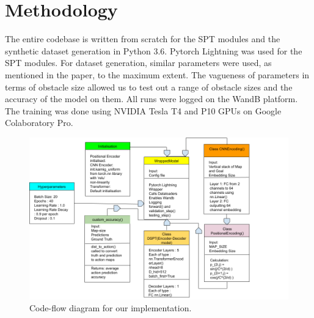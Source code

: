 
\section{Methodology}
The entire codebase is written from scratch for the SPT modules and the synthetic dataset generation in Python 3.6. Pytorch Lightning was used for the SPT modules. For dataset generation, similar parameters were used, as mentioned in the paper, to the maximum extent. The vagueness of parameters in terms of obstacle size allowed us to test out a range of obstacle sizes and the accuracy of the model on them. All runs were logged on the WandB platform. The training was done using NVIDIA Tesla T4 and P10 GPUs on Google Colaboratory Pro.
\begin{figure}
\begin {center}
\includegraphics[width=1.15\textwidth]{../openreview/images/DSPT-MLRC.png}
\caption{Code-flow diagram for our implementation.}
\label{fig:ecg}
\end {center}
\end{figure}


